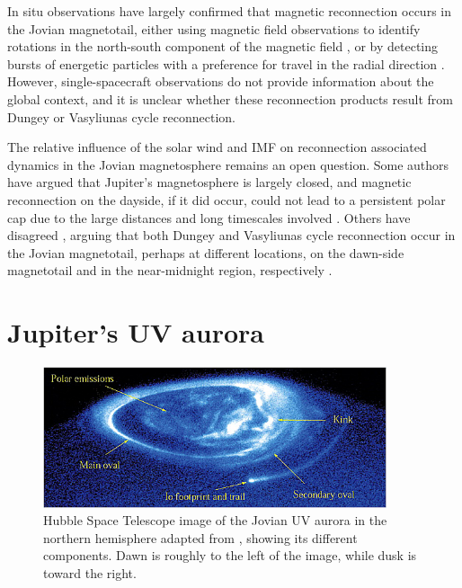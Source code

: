 In situ observations have largely confirmed that magnetic reconnection occurs in the Jovian magnetotail, either using magnetic field observations to identify rotations in the north-south component of the magnetic field \cite{Vogt2010a,Vogt2014}, or by detecting bursts of energetic particles with a preference for travel in the radial direction \cite{Woch2002a,Kronberg2008MassParameters, Kronberg2007AMagnetosphere}. However, single-spacecraft observations do not provide information about the global context, and it is unclear whether these reconnection products result from Dungey or Vasyliunas cycle reconnection. 

The relative influence of the solar wind and IMF on reconnection associated dynamics in the Jovian magnetosphere remains an open question. Some authors have argued that Jupiter's magnetosphere is largely closed, and magnetic reconnection on the dayside, if it did occur, could not lead to a persistent polar cap due to the large distances and long timescales involved \cite{McComas2007}. Others have disagreed \cite{Cowley2008}, arguing that both Dungey and Vasyliunas cycle reconnection occur in the Jovian magnetotail, perhaps at different locations, on the dawn-side magnetotail and in the near-midnight region, respectively \cite{Cowley2003a}. 


\section{Jupiter's UV aurora}

\begin{figure}
    \centering
    \includegraphics[width=0.9\textwidth]{images1/jupiter-uv-aurora-1.png}
    \caption{Hubble Space Telescope image of the Jovian UV aurora in the northern hemisphere adapted from \protect{}, showing its different components. Dawn is roughly to the left of the image, while dusk is toward the right.}
    \label{fig:jupiter-uv-aurora}
\end{figure}

